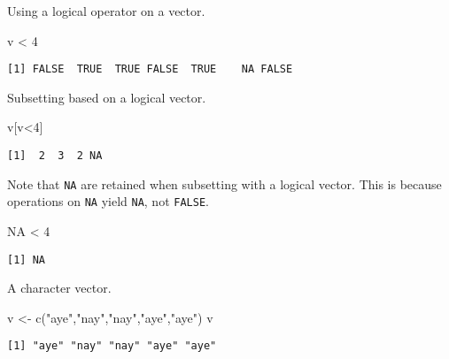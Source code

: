 \documentclass[
  letterpaper,
  DIV=11,
  numbers=noendperiod]{scrartcl}
\newenvironment{Shaded}{\begin{snugshade}}{\end{snugshade}}
\newcommand{\ConstantTok}[1]{\textcolor[rgb]{0.56,0.35,0.01}{#1}}
\newcommand{\DecValTok}[1]{\textcolor[rgb]{0.68,0.00,0.00}{#1}}
\newcommand{\FunctionTok}[1]{\textcolor[rgb]{0.28,0.35,0.67}{#1}}
\newcommand{\NormalTok}[1]{\textcolor[rgb]{0.00,0.23,0.31}{#1}}
\newcommand{\OtherTok}[1]{\textcolor[rgb]{0.00,0.23,0.31}{#1}}
\newcommand{\SpecialCharTok}[1]{\textcolor[rgb]{0.37,0.37,0.37}{#1}}
\newcommand{\StringTok}[1]{\textcolor[rgb]{0.13,0.47,0.30}{#1}}
\begin{document}
Using a logical operator on a vector.

\begin{Shaded}
\begin{Highlighting}[]
\NormalTok{v }\SpecialCharTok{\textless{}} \DecValTok{4}
\end{Highlighting}
\end{Shaded}

\begin{verbatim}
[1] FALSE  TRUE  TRUE FALSE  TRUE    NA FALSE
\end{verbatim}

Subsetting based on a logical vector.

\begin{Shaded}
\begin{Highlighting}[]
\NormalTok{v[v}\SpecialCharTok{\textless{}}\DecValTok{4}\NormalTok{]}
\end{Highlighting}
\end{Shaded}

\begin{verbatim}
[1]  2  3  2 NA
\end{verbatim}

Note that \texttt{NA} are retained when subsetting with a logical
vector. This is because operations on \texttt{NA} yield \texttt{NA}, not
\texttt{FALSE}.

\begin{Shaded}
\begin{Highlighting}[]
\ConstantTok{NA} \SpecialCharTok{\textless{}} \DecValTok{4}
\end{Highlighting}
\end{Shaded}

\begin{verbatim}
[1] NA
\end{verbatim}

A character vector.

\begin{Shaded}
\begin{Highlighting}[]
\NormalTok{v }\OtherTok{\textless{}{-}} \FunctionTok{c}\NormalTok{(}\StringTok{"aye"}\NormalTok{,}\StringTok{"nay"}\NormalTok{,}\StringTok{"nay"}\NormalTok{,}\StringTok{"aye"}\NormalTok{,}\StringTok{"aye"}\NormalTok{)}
\NormalTok{v}
\end{Highlighting}
\end{Shaded}

\begin{verbatim}
[1] "aye" "nay" "nay" "aye" "aye"
\end{verbatim}
\end{document}
